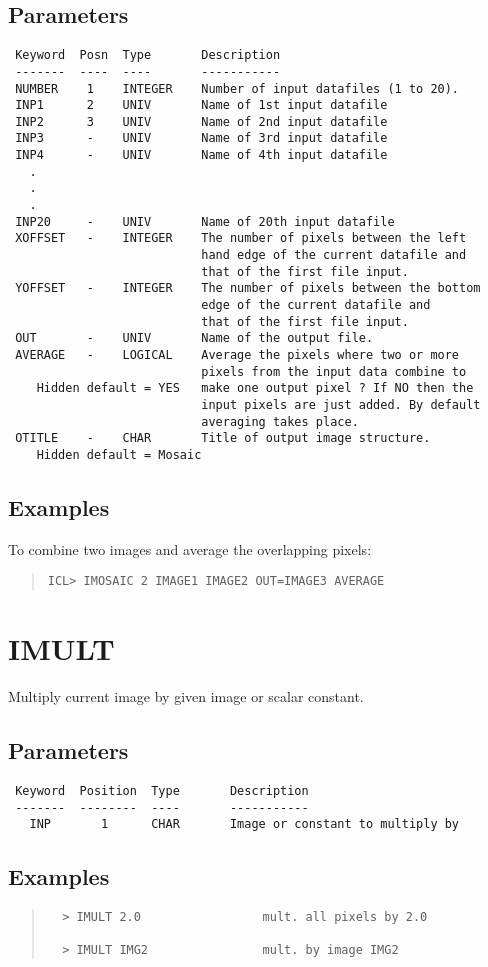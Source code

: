 \documentclass{book}
\renewcommand{\_}{{\tt\char'137}}     %
\begin{document}
\subsection{Parameters}
\begin{verbatim}
 Keyword  Posn  Type       Description
 -------  ----  ----       -----------
 NUMBER    1    INTEGER    Number of input datafiles (1 to 20).
 INP1      2    UNIV       Name of 1st input datafile
 INP2      3    UNIV       Name of 2nd input datafile
 INP3      -    UNIV       Name of 3rd input datafile
 INP4      -    UNIV       Name of 4th input datafile
   .
   .
   .
 INP20     -    UNIV       Name of 20th input datafile
 XOFFSET   -    INTEGER    The number of pixels between the left
                           hand edge of the current datafile and
                           that of the first file input.
 YOFFSET   -    INTEGER    The number of pixels between the bottom
                           edge of the current datafile and
                           that of the first file input.
 OUT       -    UNIV       Name of the output file.
 AVERAGE   -    LOGICAL    Average the pixels where two or more
                           pixels from the input data combine to
    Hidden default = YES   make one output pixel ? If NO then the
                           input pixels are just added. By default
                           averaging takes place.
 OTITLE    -    CHAR       Title of output image structure.
    Hidden default = Mosaic

\end{verbatim}\subsection{Examples}
To combine two images and average the overlapping pixels:
\begin{quote}\begin{verbatim}
ICL> IMOSAIC 2 IMAGE1 IMAGE2 OUT=IMAGE3 AVERAGE
\end{verbatim}\end{quote}
\section{IMULT}
Multiply current image by given image or scalar constant.

\subsection{Parameters}
\begin{verbatim}
 Keyword  Position  Type       Description
 -------  --------  ----       -----------
   INP       1      CHAR       Image or constant to multiply by

\end{verbatim}\subsection{Examples}
\begin{quote}\begin{verbatim}
  > IMULT 2.0                 mult. all pixels by 2.0

  > IMULT IMG2                mult. by image IMG2
 \end{verbatim}\end{quote}
\end{document}

